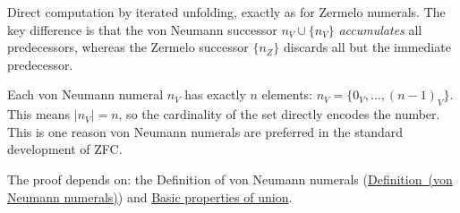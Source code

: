 \begin{remark*}
Direct computation by iterated unfolding, exactly as for Zermelo numerals.
The key difference is that the von Neumann successor $n_V \cup \{n_V\}$
\emph{accumulates} all predecessors, whereas the Zermelo successor $\{n_Z\}$
discards all but the immediate predecessor.
\end{remark*}

\begin{remark*}
Each von Neumann numeral $n_V$ has exactly $n$ elements: $n_V =
\{0_V,\ldots,(n-1)_V\}$. This means $|n_V| = n$, so the cardinality of the
set directly encodes the number. This is one reason von Neumann numerals are
preferred in the standard development of ZFC.
\end{remark*}

\begin{remark*}[Dependencies]
The proof depends on: the Definition of von Neumann numerals
(\hyperref[def:vn-numerals]{Definition~(von Neumann numerals)}) and
\hyperref[prop:union-basics]{Basic properties of union}.
\end{remark*}

